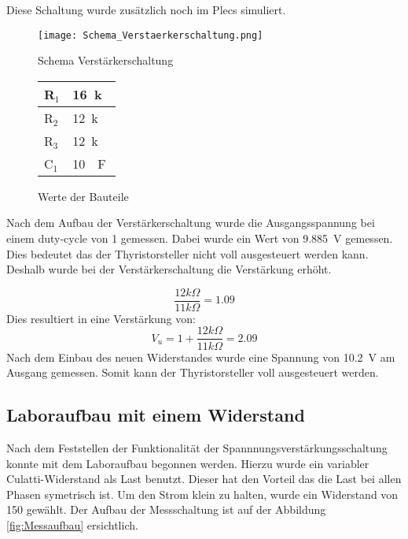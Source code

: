 Diese Schaltung wurde zusätzlich noch im Plecs simuliert.



\begin{figure}[ht!]  
	\centering 
	\begin{minipage}[t]{.76\textwidth} \centering 
		\centering
		\texttt{[image: Schema\_Verstaerkerschaltung.png]}	
		\caption{Schema Verstärkerschaltung}\label{fig:Verstaerkerschaltung}
	\end{minipage}	
	\begin{minipage}[b]{.23\textwidth}
		\centering
		\begin{tabular}{|l|l|}
			\hline
			R$_1$ & \SI{16}{k\Omega} 	\\ 	\hline
			R$_2$ & \SI{12}{k\Omega} 	\\ 	\hline
			R$_3$ & \SI{12}{k\Omega} 	\\	\hline
			C$_1$ & \SI{10}{\mu F} 		\\	\hline
		\end{tabular}
		\caption{Werte der Bauteile}
		\label{tab:Verstaerkerschaltung}
	\end{minipage}
\end{figure} 



Nach dem Aufbau der Verstärkerschaltung wurde die Ausgangsspannung bei einem duty-cycle von 1 gemessen. Dabei wurde ein Wert von \SI{9.885}{V} gemessen. Dies bedeutet das der Thyristorsteller nicht voll ausgesteuert werden kann. Deshalb wurde bei der Verstärkerschaltung die Verstärkung erhöht. 

\begin{equation}
\frac{12k\Omega}{11k\Omega} = 1.09
\end{equation}
Dies resultiert in eine Verstärkung von:
\begin{equation}
V_u = 1 + \frac{12k\Omega}{11k\Omega} = 2.09
\end{equation}
Nach dem Einbau des neuen Widerstandes wurde eine Spannung von \SI{10.2}{V} am Ausgang gemessen. Somit kann der Thyristorsteller voll ausgesteuert werden.

\subsection{Laboraufbau mit einem Widerstand}
Nach dem Feststellen der Funktionalität der Spannnungsverstärkungsschaltung konnte mit dem Laboraufbau begonnen werden. Hierzu wurde ein variabler Culatti-Widerstand als Last benutzt. Dieser hat den Vorteil das die Last bei allen Phasen symetrisch ist. Um den Strom klein zu halten, wurde ein Widerstand von \SI{150}{\Omega} gewählt. Der Aufbau der Messschaltung ist auf der Abbildung \ref{fig:Messaufbau} ersichtlich. 


